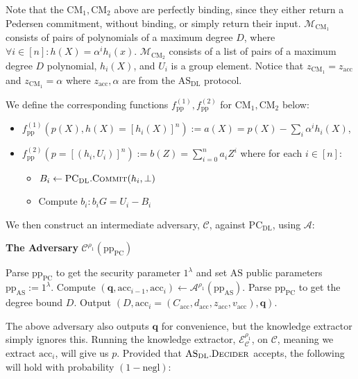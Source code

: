\documentclass[
]{article}
\providecommand{\tightlist}{%
  \setlength{\itemsep}{0pt}\setlength{\parskip}{0pt}}
\newcommand*\Ac{\mathcal{A}}
\newcommand*\Cc{\mathcal{C}}
\newcommand*\Ec{\mathcal{E}}
\newcommand*\Mc{\mathcal{M}}
\renewcommand*\a{\alpha}
\renewcommand*\l{\lambda}
\renewcommand{\vec}[1]{ \boldsymbol{#1} }
\newcommand*{\negl}{\text{negl}}
\newcommand*{\pp}{\mathrm{pp}}
\newcommand*{\acc}{\mathrm{acc}}
\newcommand*{\Commit}{\mathrm{\text{C{\scriptsize OMMIT}}}}
\newcommand*{\AS}{\text{AS}}
\newcommand*{\PC}{\text{PC}}
\newcommand*{\PCDL}{\text{PC}_{\text{DL}}}
\newcommand*{\PCDLCommit}{\PCDL.\Commit}
\newcommand*{\ASDL}{\text{AS}_{\text{DL}}}
\newcommand*{\ASDLDecider}{\ASDL.\mathrm{\text{D\scriptsize ECIDER}}}
\newcommand*{\CM}{\mathrm{\text{CM}}}
\begin{document}
Note that the \(\CM_1, \CM_2\) above are perfectly binding, since they
either return a Pedersen commitment, without binding, or simply return
their input. \(\Mc_{\CM_1}\) consists of pairs of polynomials of a
maximum degree \(D\), where \(\forall i \in [n] : h(X) = \a^i h_i(x)\).
\(\Mc_{\CM_2}\) consists of a list of pairs of a maximum degree \(D\)
polynomial, \(h_i(X)\), and \(U_i\) is a group element. Notice that
\(z_{\CM_1} = z_\acc\) and \(z_{\CM_1}
= \a\) where \(z_\acc, \a\) are from the \(\ASDL\) protocol.

We define the corresponding functions \(f^{(1)}_{\pp}, f^{(2)}_{\pp}\)
for \(\CM_1, \CM_2\) below:

\begin{itemize}
\tightlist
\item
  \(f^{(1)}_\pp(p(X), h(X) = [h_i(X)]^n) := a(X) = p(X) - \sum_{i} \alpha^i h_i(X)\),
\item
  \(f^{(2)}_\pp(p = [(h_i, U_i)]^n) := b(Z) = \sum_{i=0}^n a_i Z^i\)
  where for each \(i \in [n]\):

  \begin{itemize}
  \tightlist
  \item
    \(B_i \leftarrow \PCDLCommit(h_i, \bot)\)
  \item
    Compute \(b_i : b_i G = U_i - B_i\)
  \end{itemize}
\end{itemize}

We then construct an intermediate adversary, \(\Cc\), against \(\PCDL\),
using \(\Ac\):

\begin{algorithm}[H]
\caption*{\textbf{The Adversary} $\Cc^{\rho_1}(\pp_\PC)$}
\begin{algorithmic}[1]
  \State Parse $\pp_\PC$ to get the security parameter $1^\l$ and set $\AS$ public parameters $\pp_{\AS} := 1^\l$.
  \State Compute $(\vec{q}, \acc_{i-1}, \acc_i) \leftarrow \Ac^{\rho_1}(\pp_\AS)$.
  \State Parse $\pp_\PC$ to get the degree bound $D$.
  \State Output $(D, \acc_i = (C_\acc, d_\acc, z_\acc, v_\acc), \vec{q})$.
\end{algorithmic}
\end{algorithm}

The above adversary also outputs \(\vec{q}\) for convenience, but the
knowledge extractor simply ignores this. Running the knowledge
extractor, \(\Ec_\Cc^{\rho_1}\), on \(\Cc\), meaning we extract
\(\acc_i\), will give us \(p\). Provided that \(\ASDLDecider\) accepts,
the following will hold with probability \((1 - \negl)\):
\end{document}

